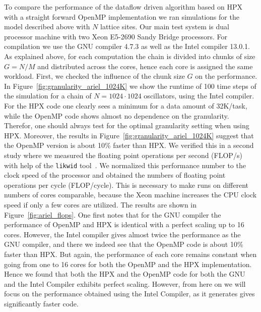 \documentclass[10pt]{scrartcl}
\begin{document}
To compare the performance of the dataflow driven algorithm based on HPX with a straight forward OpenMP implementation we ran simulations for the model described above with $N$ lattice sites.
Our main test system is dual processor machine with two Xeon E5-2690 Sandy Bridge processors.
For compilation we use the GNU compiler 4.7.3 as well as the Intel compiler 13.0.1.
As explained above, for each computation the chain is divided into chunks of size $G=N/M$ and distributed across the cores, hence each core is assigned the same workload.
First, we checked the influence of the chunk size $G$ on the performance.
In Figure~\ref{fig:granularity_ariel_1024K} we show the runtime of 100 time steps of the simulation for a chain of $N=1024\cdot1024$ oscillators, using the Intel compiler.
For the HPX code one clearly sees a minimum for a data amount of 32K/task, while the OpenMP code shows almost no dependence on the granularity.
Therefor, one should always test for the optimal granularity setting when using HPX.
Moreover, the results in Figure~\ref{fig:granularity_ariel_1024K} suggest that the OpenMP version is about 10\% faster than HPX.
We verified this in a second study where we measured the floating point operations per second (FLOP/s) with help of the \lstinline+likwid+ tool~\cite{likwid}.
We normalized this performance number to the clock speed of the processor and obtained the numbers of floating point operations per cycle (FLOP/cycle).
This is necessary to make runs on different numbers of cores comparable, because the Xeon machine increases the CPU clock speed if only a few cores are utilized.
The results are shown in Figure~\ref{fig:ariel_flops}.
One first notes that for the GNU compiler the performance of OpenMP and HPX is identical with a perfect scaling up to 16 cores.
However, the Intel compiler gives almost twice the performance as the GNU compiler, and there we indeed see that the OpenMP code is about 10\% faster than HPX.
But again, the performance of each core remains constant when going from one to 16 cores for both the OpenMP and the HPX implementation.
Hence we found that both the HPX and the OpenMP code for both the GNU and the Intel Compiler exhibits perfect scaling.
However, from here on we will focus on the performance obtained using the Intel Compiler, as it generates gives significantly faster code.
\end{document}
